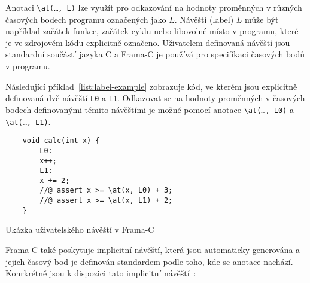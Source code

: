 Anotaci \texttt{\textbackslash at(\dots, L)} lze využít pro odkazování na hodnoty proměnných
v různých časových bodech programu označených jako $L$.
Návěští (label) $L$ může být například začátek funkce, začátek cyklu nebo libovolné místo v programu,
které je ve zdrojovém kódu explicitně označeno.
Uživatelem definovaná návěští jsou standardní součástí jazyka C
a Frama\mbox{-}C je používá pro specifikaci časových bodů v programu.

Následující příklad~\ref{list:label-example} zobrazuje kód,
ve kterém jsou explicitně definovaná dvě návěští \texttt{L0} a \texttt{L1}.
Odkazovat se na hodnoty proměnných v časových bodech definovanými těmito návěštími
je možné pomocí anotace \texttt{\textbackslash at(\dots, L0)} a \texttt{\textbackslash at(\dots, L1)}.

\begin{listing}[H]
    \begin{verbatim}
    void calc(int x) {
        L0:
        x++;
        L1:
        x += 2;
        //@ assert x >= \at(x, L0) + 3;
        //@ assert x >= \at(x, L1) + 2;
    }
    \end{verbatim}
    \caption{Ukázka uživatelského návěští v Frama-C}
    \label{list:label-example}
\end{listing}

Frama\mbox{-}C také poskytuje implicitní návěští,
která jsou automaticky generována a jejich časový bod je definován
standardem podle toho, kde se anotace nachází.
Konrkrétně jsou k dispozici tato implicitní návěští~\cite{ACSLSpec}:

